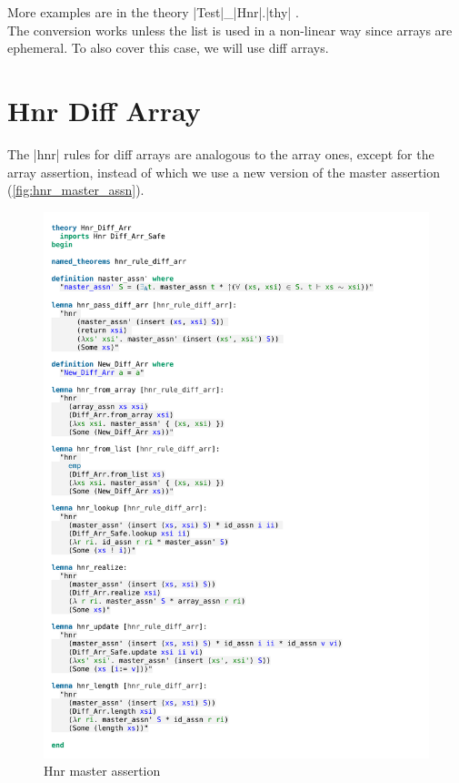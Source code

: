 \noindent More examples are in the theory |Test|\_|Hnr|.|thy| \parencite{repo}. \\
The conversion works unless the list is used in a non-linear way since arrays are ephemeral. To also cover this case, we will use diff arrays. 

\section{Hnr Diff Array}\label{section:hnr_diff_arr}

The |hnr| rules for diff arrays are analogous to the array ones, except for the array assertion, instead of which we use a new version of the master assertion (\autoref{fig:hnr_master_assn}). 

\begin{figure}[htpb]
    \includegraphics[trim={0 25,4cm 0 3,4cm}, clip, width=1.00\textwidth]{figures/Theory_Hnr_Diff_Arr.pdf}
    \caption[Hnr master assertion]{Hnr master assertion}
    \label{fig:hnr_master_assn}
\end{figure}

